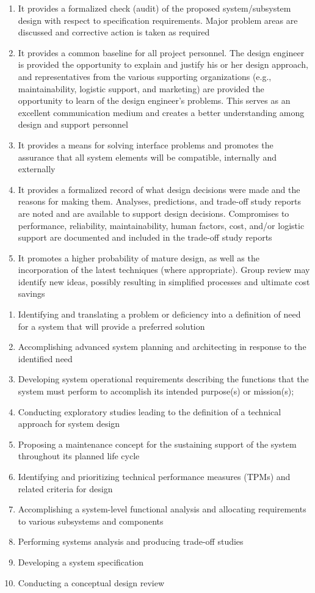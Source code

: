 \begin{enumerate}
	\item It provides a formalized check (audit) of the proposed system/subsystem design with respect to specification requirements. Major problem areas are discussed and corrective action is taken as required
	\item It provides a common baseline for all project personnel. The design engineer is provided the opportunity to explain and justify his or her design approach, and representatives from the various supporting organizations (e.g., maintainability, logistic support, and marketing) are provided the opportunity to learn of the design engineer’s problems. This serves as an excellent communication medium and creates a better understanding among design and support personnel
	\item It provides a means for solving interface problems and promotes the assurance that all system elements will be compatible, internally and externally
	\item It provides a formalized record of what design decisions were made and the reasons for making them. Analyses, predictions, and trade-off study reports are noted and are available to support design decisions. Compromises to performance, reliability, maintainability, human factors, cost, and/or logistic support are documented and included in the trade-off study reports
	\item It promotes a higher probability of mature design, as well as the incorporation of the latest techniques (where appropriate). Group review may identify new ideas, possibly resulting in simplified processes and ultimate cost savings
\end{enumerate}

\begin{enumerate}
	\item Identifying and translating a problem or deficiency into a definition of need for a system that will provide a preferred solution
	\item Accomplishing advanced system planning and architecting in response to the identified need
	\item Developing system operational requirements describing the functions that the system must perform to accomplish its intended purpose(s) or mission(s);
	\item Conducting exploratory studies leading to the definition of a technical approach for system design
	\item Proposing a maintenance concept for the sustaining support of the system throughout its planned life cycle
	\item Identifying and prioritizing technical performance measures (TPMs) and related criteria for design
	\item Accomplishing a system-level functional analysis and allocating requirements to various subsystems and components
	\item Performing systems analysis and producing trade-off studies
	\item Developing a system specification
	\item Conducting a conceptual design review
\end{enumerate}

